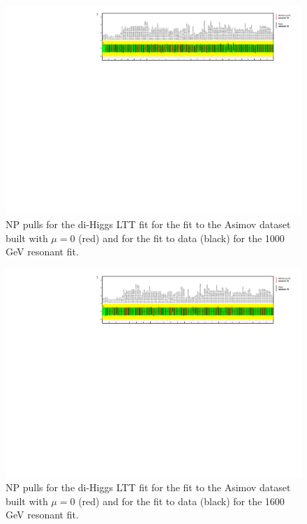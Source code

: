 \begin{figure}
\centering
\includegraphics[angle=270]{figures/results/HH/LepHad/NP_allExceptGammas_2HDM1000_LTT.pdf}
\caption{NP pulls for the di-Higgs \lephad LTT fit for the fit to the Asimov dataset built with $\mu=0$ (red) and for the fit to data (black) for the 1000 GeV resonant fit.}
\label{fig:LepHadPostfitNPPulls2HDM1000LTT}
\end{figure}

\begin{figure}
\centering
\includegraphics[angle=270]{figures/results/HH/LepHad/NP_allExceptGammas_2HDM1600_LTT.pdf}
\caption{NP pulls for the di-Higgs \lephad LTT fit for the fit to the Asimov dataset built with $\mu=0$ (red) and for the fit to data (black) for the 1600 GeV resonant fit.}
\label{fig:LepHadPostfitNPPulls2HDM1600LTT}
\end{figure}

